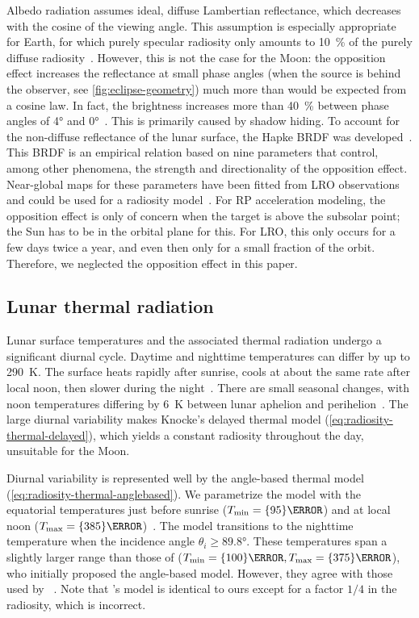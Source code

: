 Albedo radiation assumes ideal, diffuse Lambertian reflectance, which decreases with the cosine of the viewing angle. This assumption is especially appropriate for Earth, for which purely specular radiosity only amounts to \qty{10}{\percent} of the purely diffuse radiosity~\cite{Knocke1988}. However, this is not the case for the Moon: the opposition effect increases the reflectance at small phase angles (when the source is behind the observer, see \cref{fig:eclipse-geometry}) much more than would be expected from a cosine law. In fact, the brightness increases more than \qty{40}{\percent} between phase angles of \ang{4} and \ang{0}~\cite{Buratti1996}. This is primarily caused by shadow hiding. To account for the non-diffuse reflectance of the lunar surface, the Hapke \gls{BRDF} was developed~\cite{Hapke2012}. This \gls{BRDF} is an empirical relation based on nine parameters that control, among other phenomena, the strength and directionality of the opposition effect. Near-global maps for these parameters have been fitted from \gls{LRO} observations and could be used for a radiosity model~\cite{Sato2014}. For \gls{RP} acceleration modeling, the opposition effect is only of concern when the target is above the subsolar point; the Sun has to be in the orbital plane for this. For \gls{LRO}, this only occurs for a few days twice a year, and even then only for a small fraction of the orbit. Therefore, we neglected the opposition effect in this paper.




\subsection{Lunar thermal radiation}

Lunar surface temperatures and the associated thermal radiation undergo a significant diurnal cycle. Daytime and nighttime temperatures can differ by up to \qty{290}{\K}. The surface heats rapidly after sunrise, cools at about the same rate after local noon, then slower during the night~\cite{Vasavada2012}. There are small seasonal changes, with noon temperatures differing by \qty{6}{\K} between lunar aphelion and perihelion~\cite{Heiken1991}. The large diurnal variability makes Knocke's delayed thermal model (\cref{eq:radiosity-thermal-delayed}), which yields a constant radiosity throughout the day, unsuitable for the Moon.

Diurnal variability is represented well by the angle-based thermal model (\cref{eq:radiosity-thermal-anglebased}). We parametrize the model with the equatorial temperatures just before sunrise ($T_\textnormal{min} = \qty{95}{\K}$) and at local noon ($T_\textnormal{max} = \qty{385}{\K}$)~\cite{Vasavada2012}. The model transitions to the nighttime temperature when the incidence angle $\theta_i \geq \ang{89.8}$. These temperatures span a slightly larger range than those of \citeauthor{Lemoine2013} ($T_\textnormal{min} = \qty{100}{\K}, T_\textnormal{max} = \qty{375}{\K}$), who initially proposed the angle-based model. However, they agree with those used by \citeauthor{Park2011}~\cite{Park2011}. Note that \citeauthor{Park2011}'s model is identical to ours except for a factor $1/4$ in the radiosity, which is incorrect.

